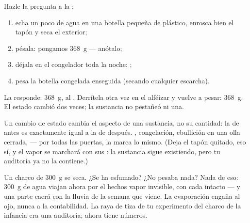 \begin{method}\label{met:g6:water-states:weigh}
Hazle la pregunta a la :
\begin{enumerate}
  \item echa un poco de agua en una botella pequeña de plástico,
        enrosca bien el tapón y seca el exterior;
  \item pésala: pongamos \qty{368}{g} --- anótalo;
  \item déjala en el congelador toda la noche:
        ;
  \item pesa la botella congelada enseguida (secando cualquier
        escarcha).
\end{enumerate}
La  responde: \qty{368}{g}, al . Derrítela otra vez en
el alféizar y vuelve a pesar: \qty{368}{g}. El estado cambió dos
veces; la sustancia no pestañeó ni una.
\end{method}

\begin{proposition}\label{prop:g6:water-states:mass}
Un cambio de estado cambia el aspecto de una sustancia, no su
cantidad: la  de antes es exactamente igual a la de después.
, congelación, ebullición en una olla cerrada, 
--- por todas las puertas, la  marca lo mismo. (Deja el tapón
quitado, eso sí, y el vapor se marchará con sus : la
sustancia sigue existiendo, pero tu auditoría ya no la contiene.)
\end{proposition}

\begin{example}\label{ex:g6:water-states:puddle}
Un charco de \qty{300}{g} se seca. ¿Se ha esfumado? ¿No pesaba nada?
Nada de eso: \qty{300}{g} de agua viajan ahora por el  hechos
vapor invisible, con cada  intacto --- y una parte caerá con la
lluvia de la semana que viene. La evaporación engaña al ojo, nunca a
la contabilidad. La raya de tiza de tu experimento del charco de la
infancia era una auditoría; ahora tiene números.
\end{example}

